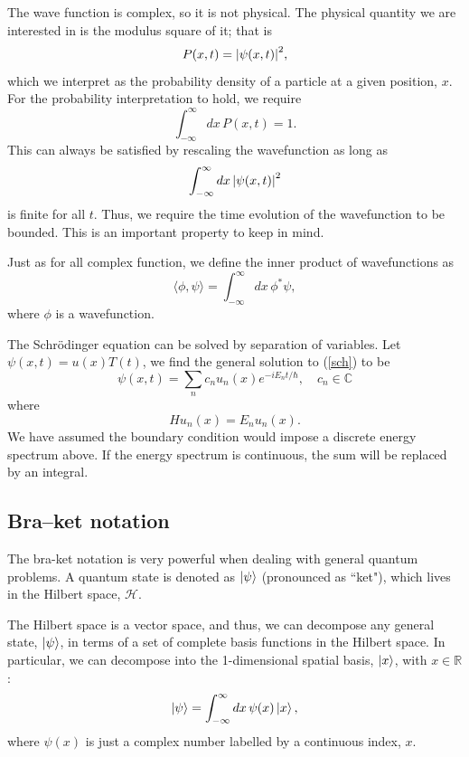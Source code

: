 \documentclass[12pt,a4paper]{article}
\begin{document}
The wave function is complex, so it is not physical. The physical quantity we are interested in is the modulus square of it; that is
\begin{equation}
    P(x,t) = \abs{\psi(x,t)}^2,
\end{equation}
which we interpret as the probability density of a particle at a given position, $x$. For the probability interpretation to hold, we require
\begin{equation}
    \int^\infty_{-\infty}dx\, P(x,t) = 1.
\end{equation}
This can always be satisfied by rescaling the wavefunction as long as
\begin{equation}
    \int^\infty_{-\infty}dx\,\abs{\psi(x,t)}^2
\end{equation}
is finite for all $t$. Thus, we require the time evolution of the wavefunction to be bounded. This is an important property to keep in mind.

Just as for all complex function, we define the inner product of wavefunctions as
\begin{equation}
    \langle\phi,\psi\rangle = \int^\infty_{-\infty}dx \, \phi^*\psi,
\end{equation}
where $\phi$ is a wavefunction.

The Schrödinger equation can be solved by separation of variables. Let $\psi(x,t)=u(x)T(t)$, we find the general solution to (\ref{sch}) to be
\begin{equation}
    \psi(x,t) = \sum_nc_nu_n(x)e^{-iE_nt/\hbar},\quad c_n\in \mathbb{C}
\end{equation}
where
\begin{equation}
    Hu_n(x) = E_nu_n(x).
\end{equation}
We have assumed the boundary condition would impose a discrete energy spectrum above. If the energy spectrum is continuous, the sum will be replaced by an integral.

\subsection{Bra–ket notation}
\label{Sec:Bra-ket}
The bra-ket notation is very powerful when dealing with general quantum problems.
A quantum state is denoted as $\ket{\psi}$ (pronounced as ``ket"), which lives in the Hilbert space, $\mathcal{H}$.

The Hilbert space is a vector space, and thus, we can decompose any general state, $\ket{\psi}$, in terms of a set of complete basis functions in the Hilbert space. In particular, we can decompose into the 1-dimensional spatial basis, $\ket{x}$, with $x\in \mathbb{R}$:
\begin{equation}
    \ket{\psi} = \int^\infty_{-\infty}dx\,\psi(x)\ket{x},
    \label{decomp}
\end{equation}
where $\psi(x)$ is just a complex number labelled by a continuous index, $x$.
\end{document}
